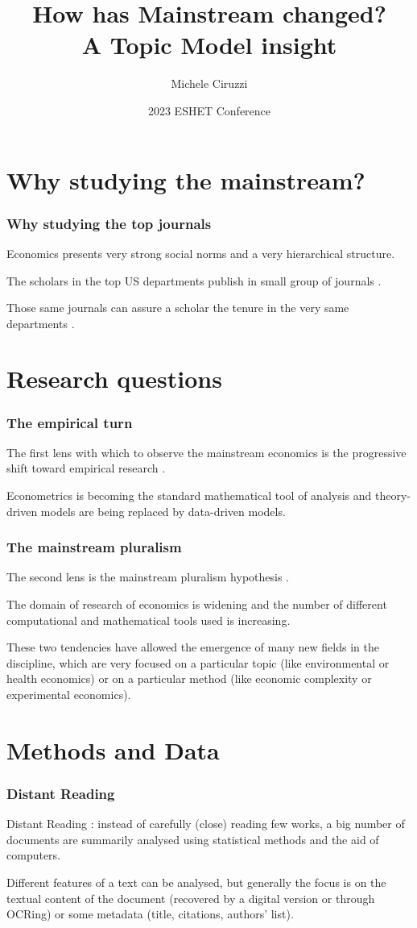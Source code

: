 \documentclass[]{beamer}
\title[How has Mainstream changed?]{How has Mainstream changed? \\ \small A Topic Model insight}
\author[Ciruzzi, M.]{Michele Ciruzzi}
\institute[UnInsubria]{Università degli Studi dell'Insubria}
\date{2023 ESHET Conference}
\begin{document}
\frame{\titlepage}

\section{Why studying the mainstream?}
\begin{frame}
	\frametitle{Why studying the top journals}
	Economics presents very strong social norms and a very hierarchical structure.

	The scholars in the top US departments publish in small group of journals \parencite{card2013,kim2006,kim2009,dusansky1998,hamermesh2013,ellison2003,heck2006}.

	Those same journals can assure a scholar the tenure in the very same departments \parencite{heckman2020}.
\end{frame}

\section{Research questions}
\begin{frame}
	\frametitle{The empirical turn}
	The first lens with which to observe the mainstream economics is the progressive shift toward empirical research \parencite{backhouse2000,backhouse2016,backhouse2017,cherrier2022}.

	Econometrics is becoming the standard mathematical tool of analysis and theory-driven models are being replaced by data-driven models.
\end{frame}

\begin{frame}
	\frametitle{The mainstream pluralism}
	The second lens is the mainstream pluralism hypothesis \parencite{davis2006,davis2019a,davis2019b,cedrini2018}.

	The domain of research of economics is widening and the number of different computational and mathematical tools used is increasing.

	These two tendencies have allowed the emergence of many new fields in the discipline, which are very focused on a particular topic (like environmental or health economics) or on a particular method (like economic complexity or experimental economics).
\end{frame}

\section{Methods and Data}
\begin{frame}
	\frametitle{Distant Reading}
	Distant Reading \parencite{moretti2013}: instead of carefully (close) reading few works, a big number of documents are summarily analysed using statistical methods and the aid of computers.

	Different features of a text can be analysed, but generally the focus is on the textual content of the document (recovered by a digital version or through OCRing) or some metadata (title, citations, authors' list).
\end{frame}
\end{document}
